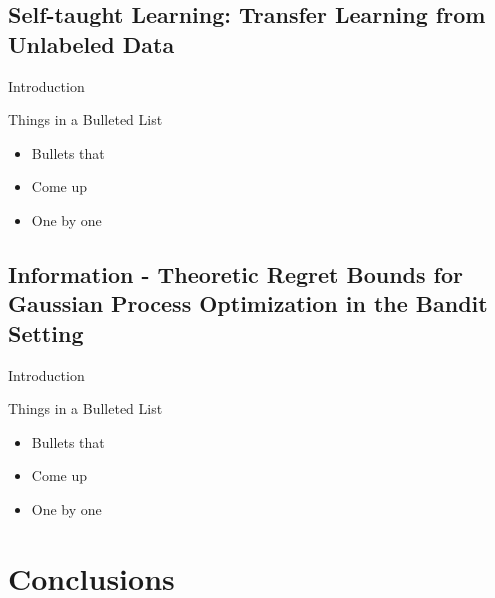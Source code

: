 \documentclass[12pt]{beamer}
\begin{document}
\subsection{Self-taught Learning: Transfer Learning from Unlabeled Data}
\begin{frame}
  {Introduction}

  Things in a Bulleted List\pause

  \begin{itemize}
  \item Bullets that\pause
  \item Come up\pause
  \item One by one
  \end{itemize}
\end{frame}
\subsection{Information - Theoretic Regret Bounds for Gaussian Process Optimization in the Bandit Setting}
\begin{frame}
  {Introduction}

  Things in a Bulleted List\pause

  \begin{itemize}
  \item Bullets that\pause
  \item Come up\pause
  \item One by one
  \end{itemize}
\end{frame}

\section{Conclusions}
\end{document}

